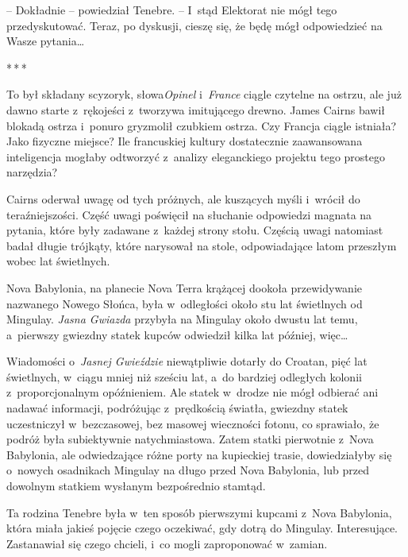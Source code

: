 \documentclass[oneside,polish,12pt,sfheadings]{mwbk}
\newcommand{\threeast}{\bigskip\par\centerline{*\,*\,*}\medskip\par}%
\begin{document}
-- Dokładnie -- powiedział Tenebre. -- I~stąd Elektorat nie mógł tego
przedyskutować. Teraz, po dyskusji, cieszę się, że będę mógł
odpowiedzieć na Wasze pytania\ldots

\threeast

To był składany scyzoryk, słowa\emph{Opinel } i~\emph{France } ciągle
czytelne na ostrzu, ale już dawno starte z~rękojeści z~tworzywa
imitującego drewno. James Cairns bawił blokadą ostrza i~ponuro gryzmolił
czubkiem ostrza. Czy Francja ciągle istniała? Jako fizyczne miejsce? Ile
francuskiej kultury dostatecznie zaawansowana inteligencja mogłaby
odtworzyć z~analizy eleganckiego projektu tego prostego narzędzia?

Cairns oderwał uwagę od tych próżnych, ale kuszących myśli i~wrócił do
teraźniejszości. Część uwagi poświęcił na słuchanie odpowiedzi magnata
na pytania, które były zadawane z~każdej strony stołu. Częścią uwagi
natomiast badał długie trójkąty, które narysował na stole, odpowiadające
latom przeszłym wobec lat świetlnych.

Nova Babylonia, na planecie Nova Terra krążącej dookoła przewidywanie
nazwanego Nowego Słońca, była w~odległości około stu lat świetlnych od
Mingulay. \emph{Jasna Gwiazda} przybyła na Mingulay około dwustu lat
temu, a~pierwszy gwiezdny statek kupców odwiedził kilka lat później,
więc\ldots

Wiadomości o~\emph{Jasnej Gwieździe} niewątpliwie dotarły do Croatan,
pięć lat świetlnych, w~ciągu mniej niż sześciu lat, a~do bardziej
odległych kolonii z~proporcjonalnym opóźnieniem. Ale statek w~drodze nie
mógł odbierać ani nadawać informacji, podróżując z~prędkością światła,
gwiezdny statek uczestniczył w~bezczasowej, bez masowej wieczności
fotonu, co sprawiało, że podróż była subiektywnie natychmiastowa. Zatem
statki pierwotnie z~Nova Babylonia, ale odwiedzające różne porty na
kupieckiej trasie, dowiedziałyby się o~nowych osadnikach Mingulay na
długo przed Nova Babylonia, lub przed dowolnym statkiem wysłanym
bezpośrednio stamtąd.

Ta rodzina Tenebre była w~ten sposób pierwszymi kupcami z~Nova
Babylonia, która miała jakieś pojęcie czego oczekiwać, gdy dotrą do
Mingulay. Interesujące. Zastanawiał się czego chcieli, i~co mogli
zaproponować w~zamian.
\end{document}
